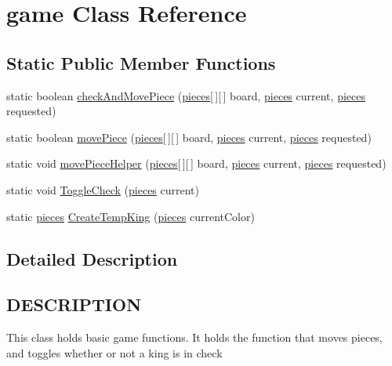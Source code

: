 \hypertarget{classgame}{\section{game Class Reference}
\label{classgame}
}
\subsection*{Static Public Member Functions}
\begin{DoxyCompactItemize}
\item 
static boolean \hyperlink{classgame_aa3eafc5948bf2ac3c082e0efd47e1876}{check\-And\-Move\-Piece} (\hyperlink{classpieces}{pieces}\mbox{[}$\,$\mbox{]}\mbox{[}$\,$\mbox{]} board, \hyperlink{classpieces}{pieces} current, \hyperlink{classpieces}{pieces} requested)
\item 
static boolean \hyperlink{classgame_afa8e7c21f9945b052f83b80eb9e87149}{move\-Piece} (\hyperlink{classpieces}{pieces}\mbox{[}$\,$\mbox{]}\mbox{[}$\,$\mbox{]} board, \hyperlink{classpieces}{pieces} current, \hyperlink{classpieces}{pieces} requested)
\item 
static void \hyperlink{classgame_a61f3c61e554690fab4d99eea0421279f}{move\-Piece\-Helper} (\hyperlink{classpieces}{pieces}\mbox{[}$\,$\mbox{]}\mbox{[}$\,$\mbox{]} board, \hyperlink{classpieces}{pieces} current, \hyperlink{classpieces}{pieces} requested)
\item 
static void \hyperlink{classgame_a8f42d4a935923af0b7957f37ac4e9866}{Toggle\-Check} (\hyperlink{classpieces}{pieces} current)
\item 
static \hyperlink{classpieces}{pieces} \hyperlink{classgame_a185d3d3e4c989894ae491fe7cc25d654}{Create\-Temp\-King} (\hyperlink{classpieces}{pieces} current\-Color)
\end{DoxyCompactItemize}


\subsection{Detailed Description}
\hypertarget{classvalidMoveTest_DESCRIPTION}{}\subsection{D\-E\-S\-C\-R\-I\-P\-T\-I\-O\-N}\label{classvalidMoveTest_DESCRIPTION}
This class holds basic game functions. It holds the function that moves pieces, and toggles whether or not a king is in check 

